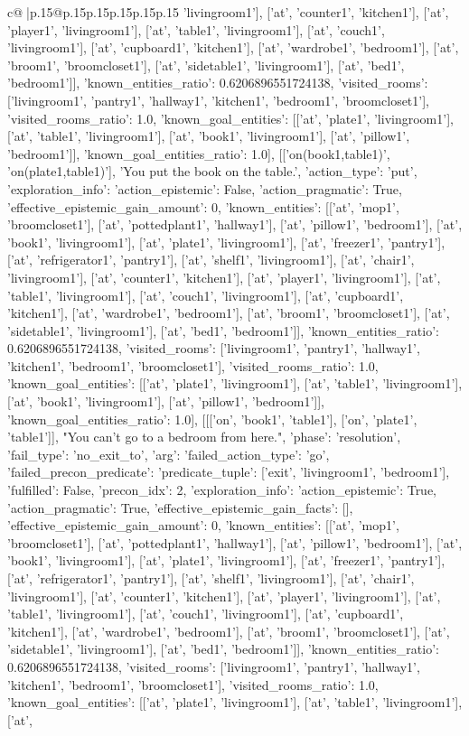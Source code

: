 \documentclass{article}
\begin{document}
{\begin{supertabular}{c@{$\;$}|p{.15\linewidth}@{}p{.15\linewidth}p{.15\linewidth}p{.15\linewidth}p{.15\linewidth}p{.15\linewidth}}
{{{'livingroom1'], ['at', 'counter1', 'kitchen1'], ['at', 'player1', 'livingroom1'], ['at', 'table1', 'livingroom1'], ['at', 'couch1', 'livingroom1'], ['at', 'cupboard1', 'kitchen1'], ['at', 'wardrobe1', 'bedroom1'], ['at', 'broom1', 'broomcloset1'], ['at', 'sidetable1', 'livingroom1'], ['at', 'bed1', 'bedroom1']], 'known_entities_ratio': 0.6206896551724138, 'visited_rooms': ['livingroom1', 'pantry1', 'hallway1', 'kitchen1', 'bedroom1', 'broomcloset1'], 'visited_rooms_ratio': 1.0, 'known_goal_entities': [['at', 'plate1', 'livingroom1'], ['at', 'table1', 'livingroom1'], ['at', 'book1', 'livingroom1'], ['at', 'pillow1', 'bedroom1']], 'known_goal_entities_ratio': 1.0}}], [['on(book1,table1)', 'on(plate1,table1)'], 'You put the book on the table.', {'action_type': 'put', 'exploration_info': {'action_epistemic': False, 'action_pragmatic': True, 'effective_epistemic_gain_amount': 0, 'known_entities': [['at', 'mop1', 'broomcloset1'], ['at', 'pottedplant1', 'hallway1'], ['at', 'pillow1', 'bedroom1'], ['at', 'book1', 'livingroom1'], ['at', 'plate1', 'livingroom1'], ['at', 'freezer1', 'pantry1'], ['at', 'refrigerator1', 'pantry1'], ['at', 'shelf1', 'livingroom1'], ['at', 'chair1', 'livingroom1'], ['at', 'counter1', 'kitchen1'], ['at', 'player1', 'livingroom1'], ['at', 'table1', 'livingroom1'], ['at', 'couch1', 'livingroom1'], ['at', 'cupboard1', 'kitchen1'], ['at', 'wardrobe1', 'bedroom1'], ['at', 'broom1', 'broomcloset1'], ['at', 'sidetable1', 'livingroom1'], ['at', 'bed1', 'bedroom1']], 'known_entities_ratio': 0.6206896551724138, 'visited_rooms': ['livingroom1', 'pantry1', 'hallway1', 'kitchen1', 'bedroom1', 'broomcloset1'], 'visited_rooms_ratio': 1.0, 'known_goal_entities': [['at', 'plate1', 'livingroom1'], ['at', 'table1', 'livingroom1'], ['at', 'book1', 'livingroom1'], ['at', 'pillow1', 'bedroom1']], 'known_goal_entities_ratio': 1.0}}], [[['on', 'book1', 'table1'], ['on', 'plate1', 'table1']], "You can't go to a bedroom from here.", {'phase': 'resolution', 'fail_type': 'no_exit_to', 'arg': {'failed_action_type': 'go', 'failed_precon_predicate': {'predicate_tuple': ['exit', 'livingroom1', 'bedroom1'], 'fulfilled': False, 'precon_idx': 2}}, 'exploration_info': {'action_epistemic': True, 'action_pragmatic': True, 'effective_epistemic_gain_facts': [], 'effective_epistemic_gain_amount': 0, 'known_entities': [['at', 'mop1', 'broomcloset1'], ['at', 'pottedplant1', 'hallway1'], ['at', 'pillow1', 'bedroom1'], ['at', 'book1', 'livingroom1'], ['at', 'plate1', 'livingroom1'], ['at', 'freezer1', 'pantry1'], ['at', 'refrigerator1', 'pantry1'], ['at', 'shelf1', 'livingroom1'], ['at', 'chair1', 'livingroom1'], ['at', 'counter1', 'kitchen1'], ['at', 'player1', 'livingroom1'], ['at', 'table1', 'livingroom1'], ['at', 'couch1', 'livingroom1'], ['at', 'cupboard1', 'kitchen1'], ['at', 'wardrobe1', 'bedroom1'], ['at', 'broom1', 'broomcloset1'], ['at', 'sidetable1', 'livingroom1'], ['at', 'bed1', 'bedroom1']], 'known_entities_ratio': 0.6206896551724138, 'visited_rooms': ['livingroom1', 'pantry1', 'hallway1', 'kitchen1', 'bedroom1', 'broomcloset1'], 'visited_rooms_ratio': 1.0, 'known_goal_entities': [['at', 'plate1', 'livingroom1'], ['at', 'table1', 'livingroom1'], ['at', }}}
\end{supertabular}}
\end{document}
